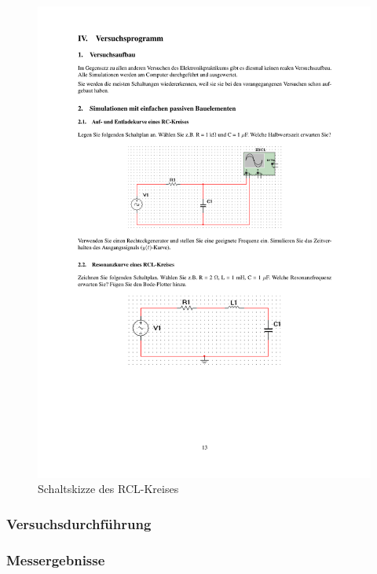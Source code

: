 \documentclass[12pt,a4paper]{article}
\begin{document}
\begin{figure}[H] 
  \centering
    \includegraphics[trim = 10mm 60mm 10mm 178mm, clip, scale = 1]{ep5_14[Page13].pdf}
  	\caption[Schaltskizze des RCL-Kreises]{Schaltskizze des RCL-Kreises\footnotemark}
  \label{fig:1}
\end{figure}

\subsubsection{Versuchsdurchführung}

\subsubsection{Messergebnisse}
\end{document}
